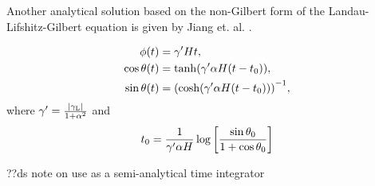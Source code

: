 Another analytical solution based on the non-Gilbert form of the Landau-Lifshitz-Gilbert equation is given by Jiang et. al. \cite{Jiang2001}.

\begin{align*}
  \phi(t) &= \gamma' H t, \\
  \cos \theta(t) &= \tanh (\gamma' \alpha H (t - t_0)), \\
  \sin \theta(t) &= {\left(  \cosh (\gamma' \alpha H (t - t_0))  \right)}^{-1}, \\
\end{align*}
where $\gamma' = \frac{{\left|{\gamma_{\text{\tiny{L}}}} \right|}}{1 + \alpha^2}$ and
\begin{equation}
  t_0 = \frac{1}{\gamma' \alpha H} \log {\left[  \frac{\sin \theta_0}{1 + \cos \theta_0}  \right]}
\end{equation}


??ds note on use as a semi-analytical time integrator


